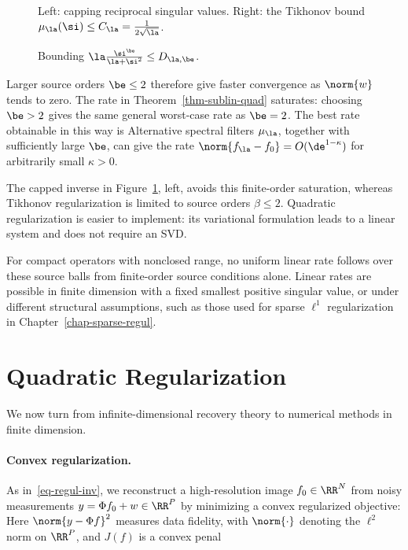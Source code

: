 \begin{figure}[tbp]
\centering
{}
\caption{Left: capping reciprocal singular values. Right: the Tikhonov bound $\mu_{\la}(\si) \leq C_\la = \frac{1}{2\sqrt{\la}}$.}
\label{fig-bound-regul-variance}
\end{figure}


\begin{figure}[tbp]
\centering
{}
\caption{Bounding $\la \frac{\si^\be}{\la+\si^2} \leq D_{\la,\be}$.}
\label{fig-ip-bound-regul}
\end{figure}



Larger source orders $\be \leq 2$ therefore give faster convergence as $\norm{w}$ tends to zero.
The rate in Theorem~\ref{thm-sublin-quad} saturates: choosing $\be > 2$ gives the same general worst-case rate as $\be=2$. The best rate obtainable in this way is
Alternative spectral filters $\mu_\la$, together with sufficiently large $\be$, can give the rate $\norm{f_\la - f_0} = O( \de^{1-\kappa} )$ for arbitrarily small $\kappa>0$.
 
The capped inverse in Figure~\ref{fig-bound-regul-variance}, left, avoids this finite-order saturation, whereas Tikhonov regularization is limited to source orders $\beta\leq2$. Quadratic regularization is easier to implement: its variational formulation leads to a linear system and does not require an SVD.
 
For compact operators with nonclosed range, no uniform linear rate follows over these source balls from finite-order source conditions alone. Linear rates are possible in finite dimension with a fixed smallest positive singular value, or under different structural assumptions, such as those used for sparse $\ell^1$ regularization in Chapter~\ref{chap-sparse-regul}.

                                                                
                                                                
                                                                
\section{Quadratic Regularization}

We now turn from infinite-dimensional recovery theory to numerical methods in finite dimension.

    
\paragraph{Convex regularization.}

As in~\eqref{eq-regul-inv}, we reconstruct a high-resolution image $f_0 \in \RR^N$ from noisy measurements $y = \Phi f_0 + w \in \RR^P$ by minimizing a convex regularized objective:
Here $\norm{y-\Phi f}^2$ measures data fidelity, with $\norm{\cdot}$ denoting the $\ell^2$ norm on $\RR^P$, and $J(f)$ is a convex penal